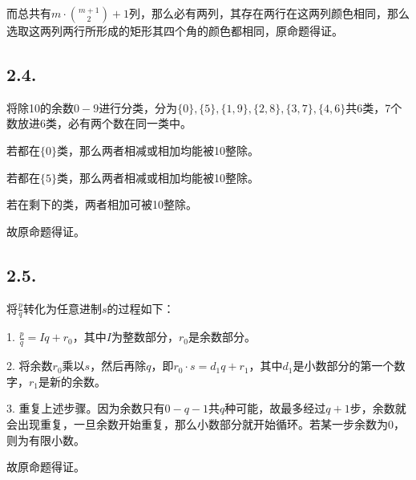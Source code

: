 \documentclass{article}
\begin{document}
而总共有$m\cdot \binom{m+1}{2}+1$列，那么必有两列，其存在两行在这两列颜色相同，那么选取这两列两行所形成的矩形其四个角的颜色都相同，原命题得证。

\subsection*{2.4.}

将除10的余数$0-9$进行分类，分为$\{0\},\{5\},\{1,9\},\{2,8\},\{3,7\},\{4,6\}$共6类，7个数放进6类，必有两个数在同一类中。

若都在$\{0\}$类，那么两者相减或相加均能被10整除。

若都在$\{5\}$类，那么两者相减或相加均能被10整除。

若在剩下的类，两者相加可被10整除。

故原命题得证。

\subsection*{2.5.}

将$\frac{p}{q}$转化为任意进制$s$的过程如下：

1. $\frac{p}{q}=Iq+r_0$，其中$I$为整数部分，$r_0$是余数部分。

2. 将余数$r_0$乘以$s$，然后再除$q$，即$r_0\cdot s=d_1 q+r_1$，其中$d_1$是小数部分的第一个数字，$r_1$是新的余数。

3. 重复上述步骤。因为余数只有$0-q-1$共$q$种可能，故最多经过$q+1$步，余数就会出现重复，一旦余数开始重复，那么小数部分就开始循环。若某一步余数为0，则为有限小数。

故原命题得证。
\end{document}

